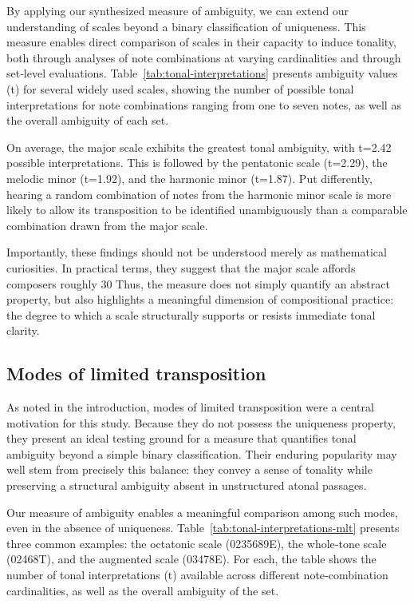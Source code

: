 \documentclass[10pt,twocolumn]{article}
\numberwithin{equation}{section} %
\begin{document}
    By applying our synthesized measure of ambiguity, we can extend our understanding of scales beyond a binary classification of uniqueness.
    This measure enables direct comparison of scales in their capacity to induce tonality, both through analyses of note combinations at varying cardinalities and through set‑level evaluations.
    Table~\ref{tab:tonal-interpretations} presents ambiguity values (t) for several widely used scales, showing the number of possible tonal interpretations for note combinations ranging from one to seven notes, as well as the overall ambiguity of each set.

    On average, the major scale exhibits the greatest tonal ambiguity, with t=2.42 possible interpretations.
    This is followed by the pentatonic scale (t=2.29), the melodic minor (t=1.92), and the harmonic minor (t=1.87).
    Put differently, hearing a random combination of notes from the harmonic minor scale is more likely to allow its transposition to be identified unambiguously than a comparable combination drawn from the major scale.

    Importantly, these findings should not be understood merely as mathematical curiosities.
    In practical terms, they suggest that the major scale affords composers roughly 30%
    Thus, the measure does not simply quantify an abstract property, but also highlights a meaningful dimension of compositional practice: the degree to which a scale structurally supports or resists immediate tonal clarity.

    

    \subsection{Modes of limited transposition}

    As noted in the introduction, modes of limited transposition were a central motivation for this study.
    Because they do not possess the uniqueness property, they present an ideal testing ground for a measure that quantifies tonal ambiguity beyond a simple binary classification.
    Their enduring popularity may well stem from precisely this balance: they convey a sense of tonality while preserving a structural ambiguity absent in unstructured atonal passages.

    Our measure of ambiguity enables a meaningful comparison among such modes, even in the absence of uniqueness.
    Table~\ref{tab:tonal-interpretations-mlt} presents three common examples: the octatonic scale (0235689E), the whole‑tone scale (02468T), and the augmented scale (03478E).
    For each, the table shows the number of tonal interpretations (t) available across different note‑combination cardinalities, as well as the overall ambiguity of the set.
\end{document}

